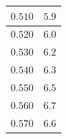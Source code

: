 \documentclass[letterpaper, 12pt]{article}
\begin{document}
\begin{longtable}{|c|c|}
    \hline
    $0.510$                                                                                                                                                                     & $5.9$                                                                                                                                                                                  \\
    \hline
    $0.520$                                                                                                                                                                     & $6.0$                                                                                                                                                                                  \\
    \hline
    $0.530$                                                                                                                                                                     & $6.2$                                                                                                                                                                                  \\
    \hline
    $0.540$                                                                                                                                                                     & $6.3$                                                                                                                                                                                  \\
    \hline
    $0.550$                                                                                                                                                                     & $6.5$                                                                                                                                                                                  \\
    \hline
    $0.560$                                                                                                                                                                     & $6.7$                                                                                                                                                                                  \\
    \hline
    $0.570$                                                                                                                                                                     & $6.6$                                                                                                                                                                                  \\

\end{longtable}
\end{document}
